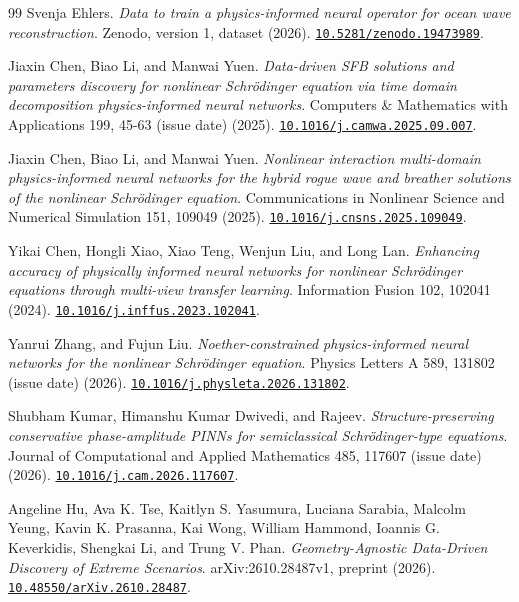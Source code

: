 \begin{thebibliography}{99}
Svenja Ehlers.
\emph{Data to train a physics-informed neural operator for ocean wave reconstruction}.
Zenodo, version 1, dataset (2026).
\href{https://doi.org/10.5281/zenodo.19473989}{\nolinkurl{10.5281/zenodo.19473989}}.

Jiaxin Chen, Biao Li, and Manwai Yuen.
\emph{Data-driven SFB solutions and parameters discovery for nonlinear Schr\"{o}dinger equation via time domain decomposition physics-informed neural networks}.
Computers \& Mathematics with Applications 199, 45-63 (issue date) (2025).
\href{https://doi.org/10.1016/j.camwa.2025.09.007}{\nolinkurl{10.1016/j.camwa.2025.09.007}}.

Jiaxin Chen, Biao Li, and Manwai Yuen.
\emph{Nonlinear interaction multi-domain physics-informed neural networks for the hybrid rogue wave and breather solutions of the nonlinear Schr\"{o}dinger equation}.
Communications in Nonlinear Science and Numerical Simulation 151, 109049 (2025).
\href{https://doi.org/10.1016/j.cnsns.2025.109049}{\nolinkurl{10.1016/j.cnsns.2025.109049}}.

Yikai Chen, Hongli Xiao, Xiao Teng, Wenjun Liu, and Long Lan.
\emph{Enhancing accuracy of physically informed neural networks for nonlinear Schr\"{o}dinger equations through multi-view transfer learning}.
Information Fusion 102, 102041 (2024).
\href{https://doi.org/10.1016/j.inffus.2023.102041}{\nolinkurl{10.1016/j.inffus.2023.102041}}.

Yanrui Zhang, and Fujun Liu.
\emph{Noether-constrained physics-informed neural networks for the nonlinear Schr\"{o}dinger equation}.
Physics Letters A 589, 131802 (issue date) (2026).
\href{https://doi.org/10.1016/j.physleta.2026.131802}{\nolinkurl{10.1016/j.physleta.2026.131802}}.

Shubham Kumar, Himanshu Kumar Dwivedi, and Rajeev.
\emph{Structure-preserving conservative phase-amplitude PINNs for semiclassical Schr\"{o}dinger-type equations}.
Journal of Computational and Applied Mathematics 485, 117607 (issue date) (2026).
\href{https://doi.org/10.1016/j.cam.2026.117607}{\nolinkurl{10.1016/j.cam.2026.117607}}.

Angeline Hu, Ava K. Tse, Kaitlyn S. Yasumura, Luciana Sarabia, Malcolm Yeung, Kavin K. Prasanna, Kai Wong, William Hammond, Ioannis G. Keverkidis, Shengkai Li, and Trung V. Phan.
\emph{Geometry-Agnostic Data-Driven Discovery of Extreme Scenarios}.
arXiv:2610.28487v1, preprint (2026).
\href{https://doi.org/10.48550/arXiv.2610.28487}{\nolinkurl{10.48550/arXiv.2610.28487}}.


\end{thebibliography}
